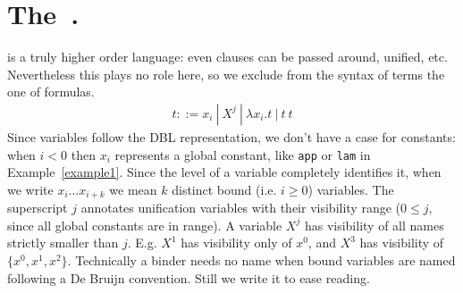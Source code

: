 \documentclass{llncs}
\begin{document}
%

\section{The~\frag.}\label{sec:fragment}
\lp{} is a truly higher order language: even clauses can be
passed around, unified, etc.  Nevertheless this plays no role here, so
we exclude from the syntax of terms the one of formulas.
\vspace{-0.5em}
$$\begin{array}{l}
   t ::= x_i ~|~ X^j ~|~ \lambda x_i.t ~|~ t~t
\end{array}$$
\vspace{-0.1em}
Since variables follow the DBL representation, we don't have a case
for constants: when $i < 0$ then $x_i$ represents a global constant,
like \verb+app+ or \verb+lam+ in Example~\ref{example1}.  Since the
level of a variable completely identifies it, when we write
$x_i \ldots x_{i+k}$ we mean $k$ distinct bound (i.e. $i \geq 0$) variables.
The superscript $j$ annotates unification variables with their
visibility range ($0 \leq j$, since all global constants are in range).  
A variable $X^j$ has visibility of all names strictly
smaller than $j$. E.g.  $X^1$ has visibility only of $x^0$, and $X^3$ has
visibility of $\{x^0,x^1,x^2\}$.  Technically a binder needs no
name when bound variables are named following a De Bruijn convention.
Still we write it to ease reading.
\end{document}
